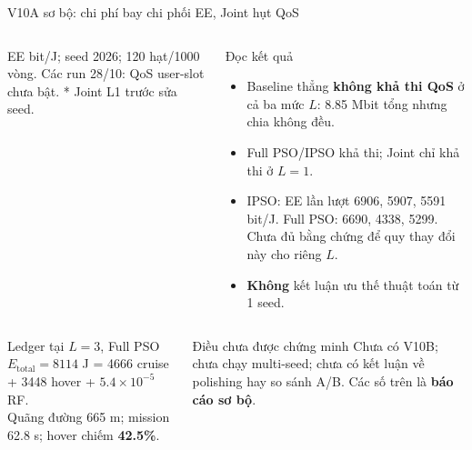 \documentclass[t,aspectratio=169]{beamer}
\newcommand{\hb}[1]{{\color{hustprimary}\textbf{#1}}}
\begin{document}
\begin{frame}{V10A sơ bộ: chi phí bay chi phối EE, Joint hụt QoS}
  \begin{columns}[T]
  \centering\scriptsize
  \vspace{2pt}
  {\tiny EE bit/J; seed 2026; 120 hạt/1000 vòng. Các run 28/10: QoS user-slot chưa bật. * Joint L1 trước sửa seed.}
  \begin{block}{Đọc kết quả}\scriptsize
  \begin{itemize}
    \item Baseline thẳng \hb{không khả thi QoS} ở cả ba mức $L$: 8.85 Mbit tổng nhưng chia không đều.
    \item Full PSO/IPSO khả thi; Joint chỉ khả thi ở $L=1$.
    \item IPSO: EE lần lượt 6906, 5907, 5591 bit/J. Full PSO: 6690, 4338, 5299. Chưa đủ bằng chứng để quy thay đổi này cho riêng $L$.
    \item \textbf{Không} kết luận ưu thế thuật toán từ 1 seed.
  \end{itemize}
  \end{block}
  \end{columns}
  \vspace{2pt}
  \begin{columns}[T]
  \begin{exampleblock}{Ledger tại $L=3$, Full PSO}\scriptsize
  $E_{\mathrm{total}}=8114$ J = 4666 cruise + 3448 hover + $5.4\times10^{-5}$ RF.\\
  Quãng đường 665 m; mission 62.8 s; hover chiếm \hb{42.5\%}.
  \end{exampleblock}
  \begin{alertblock}{Điều chưa được chứng minh}\scriptsize
  Chưa có V10B; chưa chạy multi-seed; chưa có kết luận về polishing hay so sánh A/B. Các số trên là \textbf{báo cáo sơ bộ}.
  \end{alertblock}
  \end{columns}
\end{frame}
\end{document}
